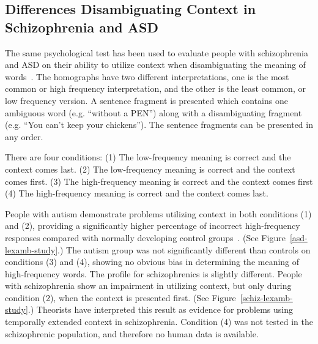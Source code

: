 \subsection{Differences Disambiguating Context in Schizophrenia and ASD}
The same psychological test has been used to evaluate people with schizophrenia and ASD on their ability to utilize context when disambiguating the meaning of words~\cite{CohenJD:1992:Schizophrenia,HappeF:1997:WCC_Homographs}. The homographs have two different interpretations, one is the most common or high frequency interpretation, and the other is the least common, or low frequency version.  A sentence fragment is presented which contains one ambiguous word (e.g. ``without a PEN'') along with a disambiguating fragment (e.g. ``You can't keep your chickens'').  The sentence fragments can be presented in any order.

There are four conditions:  (1)  The low-frequency meaning is correct and the context comes last. (2)  The low-frequency meaning is correct and the context comes first.  (3)  The high-frequency meaning is correct and the context comes first (4) The high-frequency meaning is correct and the context comes last.

People with autism demonstrate problems utilizing context in both conditions (1) and (2), providing a significantly higher percentage of incorrect high-frequency responses compared with normally developing control groups~\cite{HappeF:1997:WCC_Homographs}.  (See Figure~\ref{asd-lexamb-study}.)  The autism group was not significantly different than controls on conditions (3) and (4), showing no obvious bias in determining the meaning of high-frequency words.  The profile for schizophrenics is slightly different.  People with schizophrenia show an impairment in utilizing context, but only during condition (2), when the context is presented first. (See Figure~\ref{schiz-lexamb-study}.)  Theorists have interpreted this result as evidence for problems using temporally extended context in schizophrenia.  Condition (4) was not tested in the schizophrenic population, and therefore no human data is available.  

